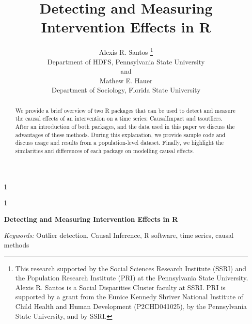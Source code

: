 \documentclass[12pt]{article}
\newcommand{\blind}{1}
\begin{document}
\def\spacingset#1{\renewcommand{\baselinestretch}%
{#1}\small\normalsize} \spacingset{1}



\blind
{
  \title{\bf Detecting and Measuring Intervention Effects in R}

  \author{
        Alexis R. Santos \thanks{This research supported by the Social
Sciences Research Institute (SSRI) and the Population Research Institute
(PRI) at the Pennsylvania State University. Alexis R. Santos is a Social
Disparities Cluster faculty at SSRI. PRI is supported by a grant from
the Eunice Kennedy Shriver National Institute of Child Health and Human
Development (P2CHD041025), by the Pennsylvania State University, and by
SSRI.} \\
    Department of HDFS, Pennsylvania State University\\
     and \\     Mathew E. Hauer \\
    Department of Sociology, Florida State University\\
      }
  \maketitle
} \fi

\blind
{
  \bigskip
  \bigskip
  \bigskip
  \begin{center}
    {\LARGE\bf Detecting and Measuring Intervention Effects in R}
  \end{center}
  \medskip
} \fi

\bigskip
\begin{abstract}
We provide a brief overview of two R packages that can be used to detect
and measure the causal effects of an intervention on a time series:
\textsf{CausalImpact} and \textsf{tsoutliers}. After an introduction of
both packages, and the data used in this paper we discuss the advantages
of these methods. During this explanation, we provide sample code and
discuss usage and results from a population-level dataset. Finally, we
highlight the similarities and differences of each package on modelling
causal effects.
\end{abstract}

\noindent%
{\it Keywords:} Outlier detection, Causal Inference, R software, time
series, causal methods
\vfill

\newpage
\spacingset{1.45} %
\end{document}
